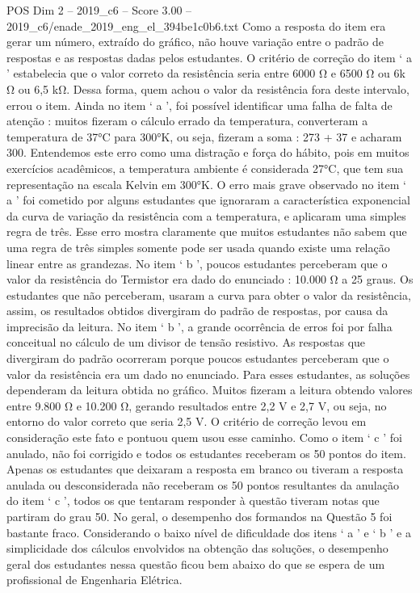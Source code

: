 \begin{textsample}{POS Dim 2 – 2019\_c6 – Score 3.00 – 2019\_c6/enade\_2019\_eng\_el\_394be1c0b6.txt}
Como a resposta do item era gerar um número, extraído do gráfico, não houve variação entre o padrão de respostas e as respostas dadas pelos estudantes.
O critério de correção do item ‘ a ’ estabelecia que o valor correto da resistência seria entre 6000 Ω e 6500 Ω ou 6k Ω ou 6,5 kΩ.
Dessa forma, quem achou o valor da resistência fora deste intervalo, errou o item.
Ainda no item ‘ a ’, foi possível identificar uma falha de falta de atenção : muitos fizeram o cálculo errado da temperatura, converteram a temperatura de 37{\EmojiFont °}C para 300{\EmojiFont °}K, ou seja, fizeram a soma : 273 + 37 e acharam 300.
Entendemos este erro como uma distração e força do hábito, pois em muitos exercícios acadêmicos, a temperatura ambiente é considerada 27{\EmojiFont °}C, que tem sua representação na escala Kelvin em 300{\EmojiFont °}K.
O erro mais grave observado no item ‘ a ’ foi cometido por alguns estudantes que ignoraram a característica exponencial da curva de variação da resistência com a temperatura, e aplicaram uma simples regra de três.
Esse erro mostra claramente que muitos estudantes não sabem que uma regra de três simples somente pode ser usada quando existe uma relação linear entre as grandezas.
No item ‘ b ’, poucos estudantes perceberam que o valor da resistência do Termistor era dado do enunciado : 10.000 Ω a 25 graus.
Os estudantes que não perceberam, usaram a curva para obter o valor da resistência, assim, os resultados obtidos divergiram do padrão de respostas, por causa da imprecisão da leitura.
No item ‘ b ’, a grande ocorrência de erros foi por falha conceitual no cálculo de um divisor de tensão resistivo.
As respostas que divergiram do padrão ocorreram porque poucos estudantes perceberam que o valor da resistência era um dado no enunciado.
Para esses estudantes, as soluções dependeram da leitura obtida no gráfico.
Muitos fizeram a leitura obtendo valores entre 9.800 Ω e 10.200 Ω, gerando resultados entre 2,2 V e 2,7 V, ou seja, no entorno do valor correto que seria 2,5 V.
O critério de correção levou em consideração este fato e pontuou quem usou esse caminho.
Como o item ‘ c ’ foi anulado, não foi corrigido e todos os estudantes receberam os 50 pontos do item.
Apenas os estudantes que deixaram a resposta em branco ou tiveram a resposta anulada ou desconsiderada não receberam os 50 pontos resultantes da anulação do item ‘ c ’, todos os que tentaram responder à questão tiveram notas que partiram do grau 50.
No geral, o desempenho dos formandos na Questão 5 foi bastante fraco.
Considerando o baixo nível de dificuldade dos itens ‘ a ’ e ‘ b ’ e a simplicidade dos cálculos envolvidos na obtenção das soluções, o desempenho geral dos estudantes nessa questão ficou bem abaixo do que se espera de um profissional de Engenharia Elétrica.

\end{textsample}
